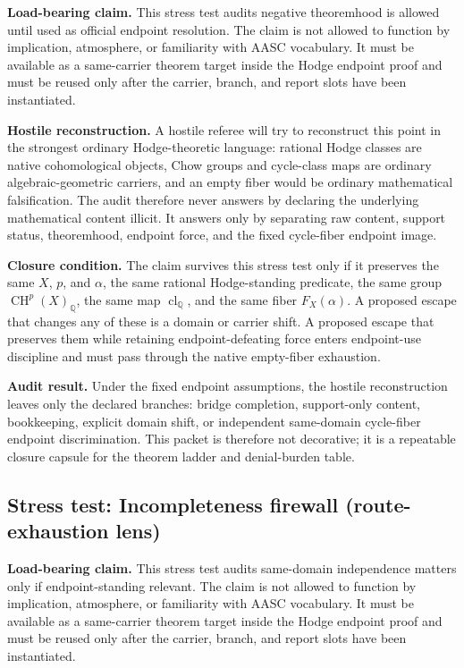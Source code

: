 \documentclass[11pt]{article}
\newcommand{\QQ}{\mathbb{Q}}
\newcommand{\CH}{\operatorname{CH}}
\newcommand{\clQ}{\operatorname{cl}_{\QQ}}
\begin{document}
\par\noindent\textbf{Load-bearing claim.} This stress test audits negative theoremhood is allowed until used as official endpoint resolution. The claim is not allowed to function by implication, atmosphere, or familiarity with AASC vocabulary. It must be available as a same-carrier theorem target inside the Hodge endpoint proof and must be reused only after the carrier, branch, and report slots have been instantiated.

\par\noindent\textbf{Hostile reconstruction.} A hostile referee will try to reconstruct this point in the strongest ordinary Hodge-theoretic language: rational Hodge classes are native cohomological objects, Chow groups and cycle-class maps are ordinary algebraic-geometric carriers, and an empty fiber would be ordinary mathematical falsification. The audit therefore never answers by declaring the underlying mathematical content illicit. It answers only by separating raw content, support status, theoremhood, endpoint force, and the fixed cycle-fiber endpoint image.

\par\noindent\textbf{Closure condition.} The claim survives this stress test only if it preserves the same $X$, $p$, and $\alpha$, the same rational Hodge-standing predicate, the same group $\CH^p(X)_\QQ$, the same map $\clQ$, and the same fiber $F_X(\alpha)$. A proposed escape that changes any of these is a domain or carrier shift. A proposed escape that preserves them while retaining endpoint-defeating force enters endpoint-use discipline and must pass through the native empty-fiber exhaustion.

\par\noindent\textbf{Audit result.} Under the fixed endpoint assumptions, the hostile reconstruction leaves only the declared branches: bridge completion, support-only content, bookkeeping, explicit domain shift, or independent same-domain cycle-fiber endpoint discrimination. This packet is therefore not decorative; it is a repeatable closure capsule for the theorem ladder and denial-burden table.


\subsection{Stress test: Incompleteness firewall (route-exhaustion lens)}

\par\noindent\textbf{Load-bearing claim.} This stress test audits same-domain independence matters only if endpoint-standing relevant. The claim is not allowed to function by implication, atmosphere, or familiarity with AASC vocabulary. It must be available as a same-carrier theorem target inside the Hodge endpoint proof and must be reused only after the carrier, branch, and report slots have been instantiated.
\end{document}

